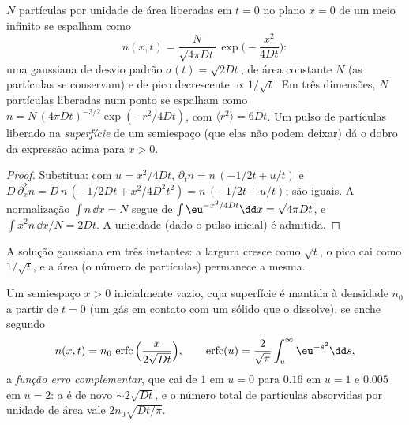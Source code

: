 \begin{proposition}\label{prop:b2:particle-diffusion:gaussian}
$N$ partículas por unidade de área liberadas em $t = 0$ no plano $x = 0$ de
um meio infinito se espalham como
\[
n(x,t) = \frac{N}{\sqrt{4\pi D t}}\,\exp\Big(-\frac{x^2}{4Dt}\Big) :
\]
uma gaussiana de desvio padrão $\sigma(t) = \sqrt{2Dt}$, de área constante
$N$ (as partículas se conservam) e de pico decrescente $\propto
1/\sqrt t$. Em três dimensões, $N$ partículas liberadas num ponto
se espalham como $n = N\,(4\pi Dt)^{-3/2}\exp(-r^2/4Dt)$, com $\langle r^2
\rangle = 6Dt$. Um pulso de partículas liberado na \emph{superfície} de
um semiespaço (que elas não podem deixar) dá o dobro da expressão acima
para $x > 0$.
\end{proposition}

\begin{proof}
Substitua: com $u = x^2/4Dt$, $\partial_t n = n\,(-1/2t + u/t)$ e
$D\,\partial_x^2 n = D\,n\,(-1/2Dt + x^2/4D^2t^2) = n\,(-1/2t + u/t)$;
são iguais. A normalização $\int n\,\dd x = N$ segue de $\int
\eu^{-x^2/4Dt}\dd x = \sqrt{4\pi Dt}$, e $\int x^2 n\,\dd x/N = 2Dt$.
A unicidade (dado o pulso inicial) é admitida.
\end{proof}

\begin{omfigure}

{\small A solução gaussiana em três instantes: a largura cresce como
$\sqrt t$, o pico cai como $1/\sqrt t$, e a área (o número de
partículas) permanece a mesma.}
\end{omfigure}

\begin{proposition}\label{prop:b2:particle-diffusion:erfc}
Um semiespaço $x > 0$ inicialmente vazio, cuja superfície é mantida à
densidade $n_0$ a partir de $t = 0$ (um gás em contato com um sólido que
o dissolve), se enche segundo
\[
n(x,t) = n_0\,\operatorname{erfc}\Big(\frac{x}{2\sqrt{Dt}}\Big),
\qquad
\operatorname{erfc}(u) = \frac{2}{\sqrt\pi}\int_u^{\infty}\eu^{-s^2}\dd s,
\]
a \emph{função erro complementar}, que cai de $1$ em $u =
0$ para $0.16$ em $u = 1$ e $0.005$ em $u = 2$: a  é
de novo $\sim 2\sqrt{Dt}$, e o número total de partículas absorvidas por
unidade de área vale $2n_0\sqrt{Dt/\pi}$.
\end{proposition}

